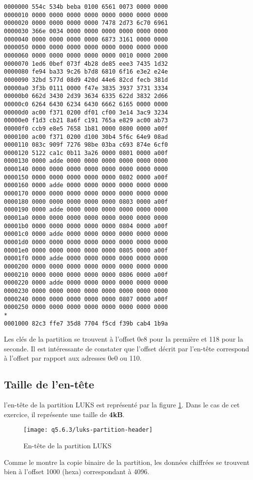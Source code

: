 \begin{lstlisting}[style=Bash]
0000000 554c 534b beba 0100 6561 0073 0000 0000
0000010 0000 0000 0000 0000 0000 0000 0000 0000
0000020 0000 0000 0000 0000 7478 2d73 6c70 6961
0000030 366e 0034 0000 0000 0000 0000 0000 0000
0000040 0000 0000 0000 0000 6873 3161 0000 0000
0000050 0000 0000 0000 0000 0000 0000 0000 0000
0000060 0000 0000 0000 0000 0000 0010 0000 2000
0000070 1ed6 0bef 073f 4b28 de85 eee3 7435 1d32
0000080 fe94 ba33 9c26 b7d8 6810 6f16 e3e2 e24e
0000090 32bd 577d 08d9 420d 44e6 82cd fecb 381d
00000a0 3f3b 0111 0000 f47e 3835 3937 3731 3334
00000b0 662d 3430 2d39 3634 6335 622d 3832 2d66
00000c0 6264 6430 6234 6430 6662 6165 0000 0000
00000d0 ac00 f371 0200 df01 cf00 3e14 3ac9 3234
00000e0 f1d3 cb21 8a6f c191 765a e829 ac00 ab73
00000f0 ccb9 e8e5 7658 1b81 0000 0800 0000 a00f
0000100 ac00 f371 0200 d100 30b4 5f6c 64e9 08ad
0000110 083c 909f 7276 98be 03ba c693 874e 6cf0
0000120 5122 ca1c 0b11 3a26 0000 0801 0000 a00f
0000130 0000 adde 0000 0000 0000 0000 0000 0000
0000140 0000 0000 0000 0000 0000 0000 0000 0000
0000150 0000 0000 0000 0000 0000 0802 0000 a00f
0000160 0000 adde 0000 0000 0000 0000 0000 0000
0000170 0000 0000 0000 0000 0000 0000 0000 0000
0000180 0000 0000 0000 0000 0000 0803 0000 a00f
0000190 0000 adde 0000 0000 0000 0000 0000 0000
00001a0 0000 0000 0000 0000 0000 0000 0000 0000
00001b0 0000 0000 0000 0000 0000 0804 0000 a00f
00001c0 0000 adde 0000 0000 0000 0000 0000 0000
00001d0 0000 0000 0000 0000 0000 0000 0000 0000
00001e0 0000 0000 0000 0000 0000 0805 0000 a00f
00001f0 0000 adde 0000 0000 0000 0000 0000 0000
0000200 0000 0000 0000 0000 0000 0000 0000 0000
0000210 0000 0000 0000 0000 0000 0806 0000 a00f
0000220 0000 adde 0000 0000 0000 0000 0000 0000
0000230 0000 0000 0000 0000 0000 0000 0000 0000
0000240 0000 0000 0000 0000 0000 0807 0000 a00f
0000250 0000 0000 0000 0000 0000 0000 0000 0000
*
0001000 82c3 ffe7 35d8 7704 f5cd f39b cab4 1b9a

\end{lstlisting}
Les clés de la partition se trouvent à l'offset 0e8 pour la première et 118 pour la seconde. Il est intéressante de constater que l'offset décrit par l'en-tête correspond à l'offset par rapport aux adresses 0e0 ou 110.

\subsection{Taille de l'en-tête}
l'en-tête de la partition LUKS est représenté par la figure \ref{fig:luks partition header}. Dans le cas de cet exercice, il représente une taille de \textbf{4kB}.
\begin{figure}
	\centering
	\texttt{[image: q5.6.3/luks-partition-header]}
	\caption{\label{fig:luks partition header}En-tête de la partition LUKS}
\end{figure}
Comme le montre la copie binaire de la partition, les données chiffrées se trouvent bien à l'offset 1000 (hexa) correspondant à 4096.

